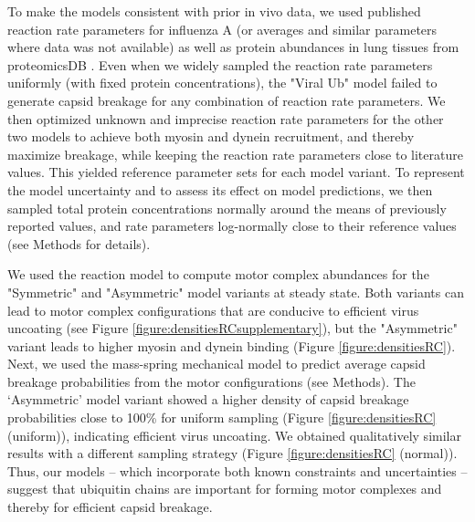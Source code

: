 To make the models consistent with prior in vivo data, we used published reaction rate parameters for influenza A (or averages and similar parameters where data was not available) as well as protein abundances in lung tissues from proteomicsDB \cite{schmidt2018proteomicsdb}. Even when we widely sampled the reaction rate parameters uniformly (with fixed protein concentrations), the "Viral Ub" model failed to generate capsid breakage for any combination of reaction rate parameters. We then optimized unknown and imprecise reaction rate parameters for the other two models to achieve both myosin and dynein recruitment, and thereby maximize breakage, while keeping the reaction rate parameters close to literature values. This yielded reference parameter sets for each model variant. To represent the model uncertainty and to assess its effect on model predictions, we then sampled total protein concentrations normally around the means of previously reported values, and rate parameters log-normally close to their reference values (see Methods for details).

We used the reaction model to compute motor complex abundances for the "Symmetric" and "Asymmetric" model variants at steady state. Both variants can lead to motor complex configurations that are conducive to efficient virus uncoating (see Figure \ref{figure:densitiesRCsupplementary}), but the "Asymmetric" variant leads to higher myosin and dynein binding (Figure \ref{figure:densitiesRC}). Next, we used the mass-spring mechanical model to predict average capsid breakage probabilities from the motor configurations (see Methods). The ‘Asymmetric’ model variant showed a higher density of capsid breakage probabilities close to 100\% for uniform sampling (Figure \ref{figure:densitiesRC} (uniform)), indicating efficient virus uncoating. We obtained qualitatively similar results with a different sampling strategy (Figure \ref{figure:densitiesRC} (normal)). Thus, our models – which incorporate both known constraints and uncertainties – suggest that ubiquitin chains are important for forming motor complexes and thereby for efficient capsid breakage.

